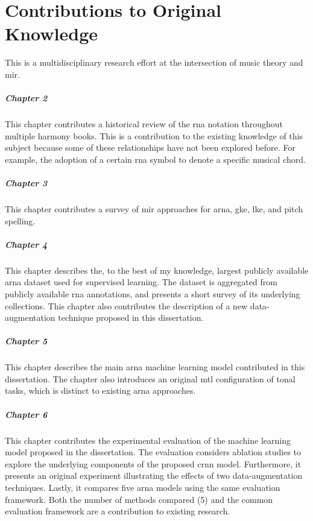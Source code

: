 \chapter*{Contributions to Original Knowledge}
\label{chap:contributionstoknowledge}

This \thesisdiss{} is a multidisciplinary research effort at
the intersection of music theory and \gls{mir}.

\paragraph{Chapter 2}

This chapter contributes a historical review of the
\gls{rna} notation throughout multiple harmony books. This
is a contribution to the existing knowledge of this subject
because some of these relationships have not been explored
before. For example, the adoption of a certain \gls{rna}
symbol to denote a specific musical chord.

\paragraph{Chapter 3}

This chapter contributes a survey of \gls{mir} approaches
for \gls{arna}, \gls{gke}, \gls{lke}, and pitch spelling. 

\paragraph{Chapter 4}

This chapter describes the, to the best of my knowledge,
largest publicly available \gls{arna} dataset used for
supervised learning. The dataset is aggregated from publicly
available \gls{rna} annotations, and presents a short survey
of its underlying collections. This chapter also contributes
the description of a new data-augmentation technique
proposed in this dissertation.

\paragraph{Chapter 5}

This chapter describes the main \gls{arna} machine learning
model contributed in this dissertation. The chapter also
introduces an original \gls{mtl} configuration of tonal
tasks, which is distinct to existing \gls{arna} approaches.

\paragraph{Chapter 6}

This chapter contributes the experimental evaluation of the
machine learning model proposed in the dissertation. The
evaluation considers ablation studies to explore the
underlying components of the proposed \gls{crnn} model.
Furthermore, it presents an original experiment illustrating
the effects of two data-augmentation techniques. Lastly, it
compares five \gls{arna} models using the same evaluation
framework. Both the number of methods compared (5) and the
common evaluation framework are a contribution to existing
research.
